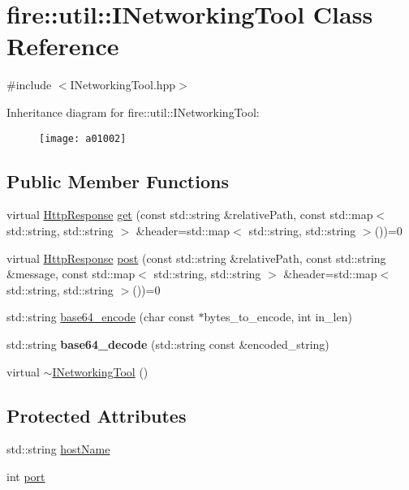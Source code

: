 \hypertarget{a01002}{}\section{fire\+:\+:util\+:\+:I\+Networking\+Tool Class Reference}
\label{a01002}


{\ttfamily \#include $<$I\+Networking\+Tool.\+hpp$>$}

Inheritance diagram for fire\+:\+:util\+:\+:I\+Networking\+Tool\+:\begin{figure}[H]
\begin{center}
\leavevmode
\texttt{[image: a01002]}
\end{center}
\end{figure}
\subsection*{Public Member Functions}
\begin{DoxyCompactItemize}
\item 
virtual \hyperlink{a00998}{Http\+Response} \hyperlink{a01002_a44b81ebf8421f0e32ed99b5e372ef007}{get} (const std\+::string \&relative\+Path, const std\+::map$<$ std\+::string, std\+::string $>$ \&header=std\+::map$<$ std\+::string, std\+::string $>$())=0
\item 
virtual \hyperlink{a00998}{Http\+Response} \hyperlink{a01002_ad6ff0e352d78f17a6f6184d1b80e0c94}{post} (const std\+::string \&relative\+Path, const std\+::string \&message, const std\+::map$<$ std\+::string, std\+::string $>$ \&header=std\+::map$<$ std\+::string, std\+::string $>$())=0
\item 
std\+::string \hyperlink{a01002_ab93be61530f01e64cb3c688976a6887b}{base64\+\_\+encode} (char const $\ast$bytes\+\_\+to\+\_\+encode, int in\+\_\+len)
\item 
\mbox{\label{a01002_ae050106ca2338332893606cea2f3881a}} 
std\+::string {\bfseries base64\+\_\+decode} (std\+::string const \&encoded\+\_\+string)
\item 
virtual \hyperlink{a01002_a2beca71d6ecb1688809f0e5e0548c17c}{$\sim$\+I\+Networking\+Tool} ()
\end{DoxyCompactItemize}
\subsection*{Protected Attributes}
\begin{DoxyCompactItemize}
\item 
std\+::string \hyperlink{a01002_ab7380b440faa49daffb65ca030380cde}{host\+Name}
\item 
int \hyperlink{a01002_ae640954c85632932a88037375a95abf4}{port}
\end{DoxyCompactItemize}


